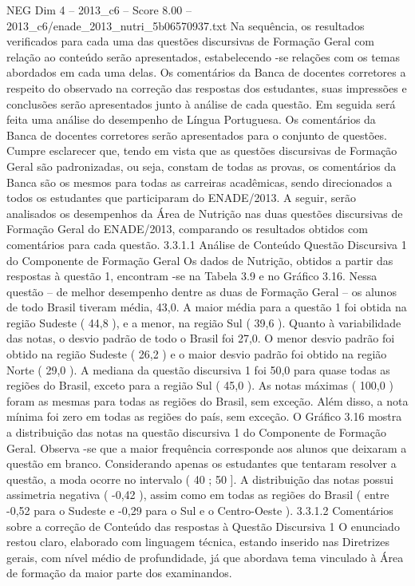 \begin{textsample}{NEG Dim 4 – 2013\_c6 – Score 8.00 – 2013\_c6/enade\_2013\_nutri\_5b06570937.txt}
Na sequência, os resultados verificados para cada uma das questões discursivas de Formação Geral com relação ao conteúdo serão apresentados, estabelecendo -se relações com os temas abordados em cada uma delas.
Os comentários da Banca de docentes corretores a respeito do observado na correção das respostas dos estudantes, suas impressões e conclusões serão apresentados junto à análise de cada questão.
Em seguida será feita uma análise do desempenho de Língua Portuguesa.
Os comentários da Banca de docentes corretores serão apresentados para o conjunto de questões.
Cumpre esclarecer que, tendo em vista que as questões discursivas de Formação Geral são padronizadas, ou seja, constam de todas as provas, os comentários da Banca são os mesmos para todas as carreiras acadêmicas, sendo direcionados a todos os estudantes que participaram do ENADE/2013.
A seguir, serão analisados os desempenhos da Área de Nutrição nas duas questões discursivas de Formação Geral do ENADE/2013, comparando os resultados obtidos com comentários para cada questão. 3.3.1.1 Análise de Conteúdo Questão Discursiva 1 do Componente de Formação Geral Os dados de Nutrição, obtidos a partir das respostas à questão 1, encontram -se na Tabela 3.9 e no Gráfico 3.16.
Nessa questão – de melhor desempenho dentre as duas de Formação Geral – os alunos de todo Brasil tiveram média, 43,0.
A maior média para a questão 1 foi obtida na região Sudeste ( 44,8 ), e a menor, na região Sul ( 39,6 ).
Quanto à variabilidade das notas, o desvio padrão de todo o Brasil foi 27,0.
O menor desvio padrão foi obtido na região Sudeste ( 26,2 ) e o maior desvio padrão foi obtido na região Norte ( 29,0 ).
A mediana da questão discursiva 1 foi 50,0 para quase todas as regiões do Brasil, exceto para a região Sul ( 45,0 ).
As notas máximas ( 100,0 ) foram as mesmas para todas as regiões do Brasil, sem exceção.
Além disso, a nota mínima foi zero em todas as regiões do país, sem exceção.
O Gráfico 3.16 mostra a distribuição das notas na questão discursiva 1 do Componente de Formação Geral.
Observa -se que a maior frequência corresponde aos alunos que deixaram a questão em branco.
Considerando apenas os estudantes que tentaram resolver a questão, a moda ocorre no intervalo ( 40 ; 50 ].
A distribuição das notas possui assimetria negativa ( -0,42 ), assim como em todas as regiões do Brasil ( entre -0,52 para o Sudeste e -0,29 para o Sul e o Centro-Oeste ). 3.3.1.2 Comentários sobre a correção de Conteúdo das respostas à Questão Discursiva 1 O enunciado restou claro, elaborado com linguagem técnica, estando inserido nas Diretrizes gerais, com nível médio de profundidade, já que abordava tema vinculado à Área de formação da maior parte dos examinandos.

\end{textsample}
